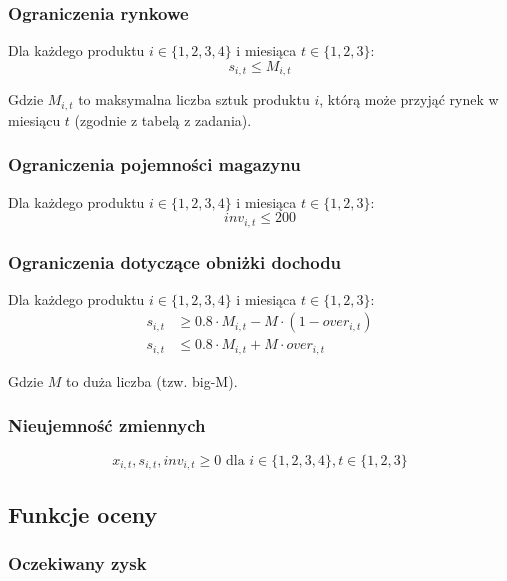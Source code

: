 \subsubsection{Ograniczenia rynkowe}

Dla każdego produktu $i \in \{1,2,3,4\}$ i miesiąca $t \in \{1,2,3\}$:
\begin{equation}
s_{i,t} \leq M_{i,t}
\end{equation}

Gdzie $M_{i,t}$ to maksymalna liczba sztuk produktu $i$, którą może przyjąć rynek w miesiącu $t$ (zgodnie z tabelą z zadania).

\subsubsection{Ograniczenia pojemności magazynu}

Dla każdego produktu $i \in \{1,2,3,4\}$ i miesiąca $t \in \{1,2,3\}$:
\begin{equation}
inv_{i,t} \leq 200
\end{equation}

\subsubsection{Ograniczenia dotyczące obniżki dochodu}

Dla każdego produktu $i \in \{1,2,3,4\}$ i miesiąca $t \in \{1,2,3\}$:
\begin{align}
s_{i,t} &\geq 0.8 \cdot M_{i,t} - M \cdot (1 - over_{i,t}) \\
s_{i,t} &\leq 0.8 \cdot M_{i,t} + M \cdot over_{i,t}
\end{align}

Gdzie $M$ to duża liczba (tzw. big-M).

\subsubsection{Nieujemność zmiennych}

\begin{equation}
x_{i,t}, s_{i,t}, inv_{i,t} \geq 0 \text{ dla } i \in \{1,2,3,4\}, t \in \{1,2,3\}
\end{equation}

\subsection{Funkcje oceny}

\subsubsection{Oczekiwany zysk}

